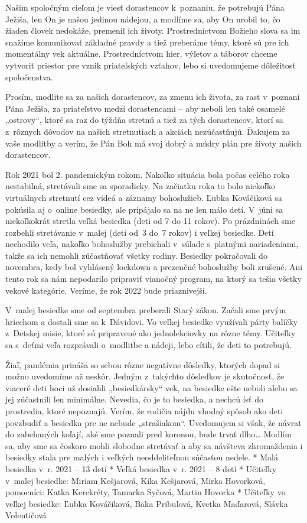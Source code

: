 Našim spoločným cieľom je viesť dorastencov k~poznaniu, že potrebujú Pána Ježiša, len On je našou jedinou nádejou, a modlíme sa, aby On urobil to, čo žiaden človek nedokáže, premenil ich životy. Prostredníctvom Božieho slova sa im snažíme komunikovať základné pravdy a tiež preberáme témy, ktoré sú pre ich momentálny vek aktuálne. Prostredníctvom hier, výletov a táborov chceme vytvoriť priestor pre vznik priateľských vzťahov, lebo si uvedomujeme dôležitosť spoločenstva.

Prosím, modlite sa za našich dorastencov, za zmenu ich života, za rast v~poznaní Pána Ježiša, za priateľstvo medzi dorastencami -- aby neboli len také osamelé „ostrovy“, ktoré sa raz do týždňa stretnú a tiež za tých dorastencov, ktorí sa z~rôznych dôvodov na našich stretnutiach a akciách nezúčastňujú. Ďakujem za vaše modlitby a verím, že Pán Boh má svoj dobrý a múdry plán pre životy našich dorastencov.



Rok 2021 bol 2. pandemickým rokom. Nakoľko situácia bola počas celého roka nestabilná, stretávali sme sa sporadicky. Na začiatku roka to bolo niekoľko virtuálnych stretnutí cez videá a záznamy bohoslužieb. Ľubka Kováčiková sa pokúsila aj o~online besiedky, ale pripájalo sa na ne len málo detí. V~júni sa niekoľkokrát stretla veľká besiedka (deti od 7 do 11 rokov). Po prázdninách sme rozbehli stretávanie v~malej (deti od~3 do~7 rokov) i veľkej besiedke. Detí nechodilo veľa, nakoľko bohoslužby prebiehali v~súlade s~platnými nariadeniami, takže sa ich nemohli zúčastňovať všetky rodiny. Besiedky pokračovali do novembra, kedy bol vyhlásený lockdown a prezenčné bohoslužby boli zrušené. Ani tento rok sa nám nepodarilo pripraviť vianočný program, na ktorý sa tešia všetky vekové kategórie. Veríme, že rok 2022 bude priaznivejší.
 
V~malej besiedke sme od septembra preberali Starý zákon. Začali sme prvým hriechom a dostali sme sa k~Dávidovi. Vo veľkej besiedke využívali párty balíčky z~Detskej misie, ktoré sú pripravené ako jednolekciovky na rôzne témy. Učiteľky sa s~deťmi veľa rozprávali o~modlitbe a nádeji, lebo cítili, že deti to potrebujú.

Žiaľ, pandémia prináša so sebou rôzne negatívne dôsledky, ktorých dopad si možno uvedomíme až neskôr. Jedným z~takýchto dôsledkov je skutočnosť, že viaceré deti hoci už dosiahli „besiedkársky“ vek, na besiedke ešte neboli alebo sa jej zúčastnili len minimálne. Nevedia, čo je to besiedka, a nechcú ísť do prostredia, ktoré nepoznajú. Verím, že rodičia nájdu vhodný spôsob ako deti povzbudiť a besiedka pre ne nebude „strašiakom“. Uvedomujem si však, že návrat do zabehaných koľají, aké sme poznali pred koronou, bude trvať dlho… Modlím sa, aby sme sa čoskoro mohli slobodne stretávať a aby sa návšteva zhromaždenia i besiedky stala pre malých i veľkých neoddeliteľnou súčasťou nedele.
\begitems
* Malá besiedka v~r. 2021 -- 13 detí 
* Veľká besiedka v~r. 2021 -- 8 detí 
* Učiteľky v~malej besiedke: Miriam Kešjarová, Kika Kešjarová, Mirka Hovorková, pomocníci: Katka Kerekréty, Tamarka Syčová, Martin Hovorka
* Učiteľky vo veľkej besiedke: Ľubka Kováčiková, Baka Pribulová, Kvetka Maďarová, Slávka Volentičová
\enditems

